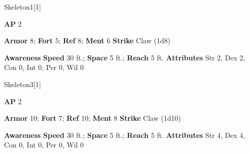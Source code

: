 \begin{monsection}{Skeleton}{1}[1]
\vspace{-1em}\vspace{-1em}
\begin{spellcontent}
\begin{spelltargetinginfo}
{\textbf{AP} 2}

\pari \textbf{Armor} 8;
\textbf{Fort} 5;
\textbf{Ref} 8;
\textbf{Ment} 6
\pari \textbf{Strike} Claw  (1d8)



\end{spelltargetinginfo}


\end{spellcontent}

\begin{monsterfooter}
\pari \textbf{Awareness} 
\pari \textbf{Speed} 30 ft.;
\textbf{Space} 5 ft.;
\textbf{Reach} 5 ft.
\pari \textbf{Attributes}
Str 2,
Dex 2,
Con 0,
Int 0,
Per 0,
Wil 0
\end{monsterfooter}
\end{monsection}



\begin{monsection}[Warrior]{Skeleton}{3}[1]
\vspace{-1em}\vspace{-1em}
\begin{spellcontent}
\begin{spelltargetinginfo}
{\textbf{AP} 2}

\pari \textbf{Armor} 10;
\textbf{Fort} 7;
\textbf{Ref} 10;
\textbf{Ment} 8
\pari \textbf{Strike} Claw  (1d10)



\end{spelltargetinginfo}


\end{spellcontent}

\begin{monsterfooter}
\pari \textbf{Awareness} 
\pari \textbf{Speed} 30 ft.;
\textbf{Space} 5 ft.;
\textbf{Reach} 5 ft.
\pari \textbf{Attributes}
Str 4,
Dex 4,
Con 0,
Int 0,
Per 0,
Wil 0
\end{monsterfooter}
\end{monsection}



